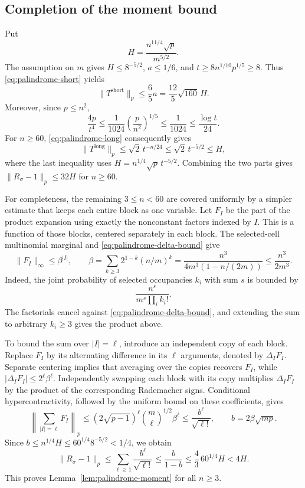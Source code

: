 \subsection{Completion of the moment bound}

Put
\[
  H=\frac{n^{11/4}\sqrt p}{m^{5/2}}.
\]
The assumption on $m$ gives $H\leq8^{-5/2}$, $a\leq1/6$, and
$t\geq8n^{1/10}p^{1/5}\geq8$.  Thus
\eqref{eq:palindrome-short} yields
\[
  \|T^{\mathrm{short}}\|_p
  \leq\frac65a=\frac{12}5\sqrt{160}\,H.
\]
Moreover, since $p\leq n^2$,
\[
  \frac{4p}{t^4}
  \leq\frac1{1024}\left(\frac p{n^2}\right)^{1/5}
  \leq\frac1{1024}\leq\frac{\log t}{24}.
\]
For $n\geq60$, \eqref{eq:palindrome-long} consequently gives
\[
  \|T^{\mathrm{long}}\|_p
  \leq\sqrt2\,t^{-n/24}
  \leq\sqrt2\,t^{-5/2}
  \leq H,
\]
where the last inequality uses $H=n^{1/4}\sqrt p\,t^{-5/2}$.
Combining the two parts gives
$\|R_\sigma-1\|_p\leq32H$ for $n\geq60$.

For completeness, the remaining $3\leq n<60$ are covered uniformly
by a simpler estimate that keeps each entire block as one variable.
Let $F_I$ be the part of the product expansion using exactly the
nonconstant factors indexed by $I$.  This is a function of those blocks,
centered separately in each block.  The selected-cell multinomial
marginal and \eqref{eq:palindrome-delta-bound} give
\[
  \|F_I\|_\infty\leq\beta^{|I|},\qquad
  \beta=\sum_{k\geq3}2^{1-k}(n/m)^k
       =\frac{n^3}{4m^3(1-n/(2m))}
       \leq\frac{n^3}{2m^3}.
\]
Indeed, the joint probability of selected occupancies $k_i$ with sum
$s$ is bounded by
\[
  \frac{n^s}{m^s\prod_i k_i!}.
\]
The factorials cancel against \eqref{eq:palindrome-delta-bound}, and
extending the sum to arbitrary $k_i\geq3$ gives the product above.

To bound the sum over $|I|=\ell$, introduce an independent copy of each
block.  Replace $F_I$ by its alternating difference in its $\ell$
arguments, denoted by $\Delta_I F_I$.  Separate centering implies
that averaging over the copies recovers $F_I$, while
$|\Delta_I F_I|\leq2^\ell\beta^\ell$.  Independently swapping each
block with its copy multiplies $\Delta_I F_I$ by the product of the
corresponding Rademacher signs.  Conditional hypercontractivity,
followed by the uniform bound on these coefficients, gives
\[
  \left\|\sum_{|I|=\ell}F_I\right\|_p
  \leq(2\sqrt{p-1})^\ell\binom m\ell^{1/2}\beta^\ell
  \leq\frac{b^\ell}{\sqrt{\ell!}},
  \qquad b=2\beta\sqrt{mp}.
\]
Since $b\leq n^{1/4}H\leq60^{1/4}8^{-5/2}<1/4$, we obtain
\[
  \|R_\sigma-1\|_p
  \leq\sum_{\ell\geq1}\frac{b^\ell}{\sqrt{\ell!}}
  \leq\frac b{1-b}
  \leq\frac43\,60^{1/4}H<4H.
\]
This proves Lemma~\ref{lem:palindrome-moment} for all $n\geq3$.
